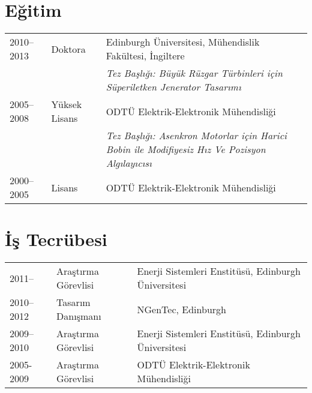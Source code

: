 \documentclass[a4paper,12pt]{article}
\begin{document}
\maketitle
 
\section{Eğitim}
\begin{tabular}{llp{12cm}}
 2010--2013 & Doktora & Edinburgh  Üniversitesi, Mühendislik Fakültesi, İngiltere\\  
& & \textit{Tez Başlığı: Büyük Rüzgar Türbinleri için Süperiletken Jenerator Tasarımı} \\ 
 2005--2008 & Yüksek Lisans & ODTÜ Elektrik-Elektronik Mühendisliği\\
& & \textit{Tez Başlığı: Asenkron Motorlar için Harici Bobin ile Modifiyesiz Hız Ve Pozisyon Algılayıcısı}\\
 2000--2005 & Lisans & ODTÜ Elektrik-Elektronik Mühendisliği \\

\end{tabular}

\section{İş Tecrübesi}

\begin{tabular}{lp{3.6cm}l}
2011-- & Araştırma Görevlisi & Enerji Sistemleri Enstitüsü, Edinburgh Üniversitesi \\ 
2010--2012 & Tasarım Danışmanı & NGenTec, Edinburgh\\
2009--2010 & Araştırma Görevlisi & Enerji Sistemleri Enstitüsü, Edinburgh Üniversitesi \\ 
2005-2009 & Araştırma Görevlisi & ODTÜ Elektrik-Elektronik Mühendisliği \\
\end{tabular}



\end{document}
